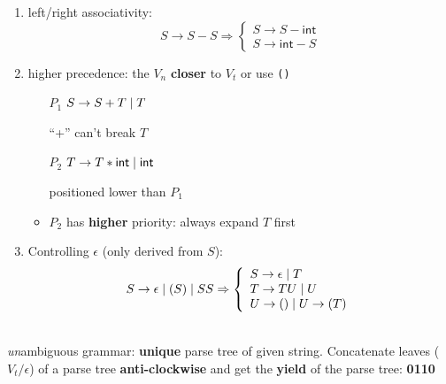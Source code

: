 {\footnotesize
\begin{minipage}{0.5\linewidth}
\begin{enumerate}
\item left/right associativity:
  \[
    S \rightarrow S - S \Rightarrow\left\{
      \begin{array}{l}
        S \rightarrow S - \mathsf{int} \\
        S \rightarrow \mathsf{int} - S
      \end{array}
       \right.
  \]
\item higher precedence: the \(V_{n}\) \textbf{closer} to \(V_{t}\) or use \verb|()|
  \begin{itemize}[leftmargin=1.5em]
    \item[$P_{1}$] \(S \rightarrow S + T \;|\; T\)
    \item[] ``+'' can't break \(T\)
    \item[$P_{2}$] \(T \rightarrow T * \mathsf{int} \;|\; \mathsf{int}\)
    \item[] positioned lower than \(P_{1}\)
    \item \(P_{2}\) has \textbf{higher} priority: always expand \(T\) first
    \end{itemize}
\item Controlling \(\epsilon\) (only derived from \(S\)):
  \[
    S \rightarrow \epsilon \;|\; (S) \;|\; SS \Rightarrow\left\{
        \begin{array}{l}
          S \rightarrow \epsilon \;|\; T\\
          T \rightarrow TU \;|\; U\\
          U \rightarrow () \;|\; U \rightarrow (T)
        \end{array}
      \right.
  \]
\end{enumerate}
\end{minipage}
\begin{minipage}[t]{0.45\linewidth}
  \centering
{}\\
\emph{un}ambiguous grammar: \textbf{unique} parse tree of given string.  Concatenate leaves (\(V_{t}/\epsilon\)) of a parse tree \textbf{anti-clockwise} and get the \textbf{yield} of the parse tree: \textbf{0110}
\end{minipage}
}
